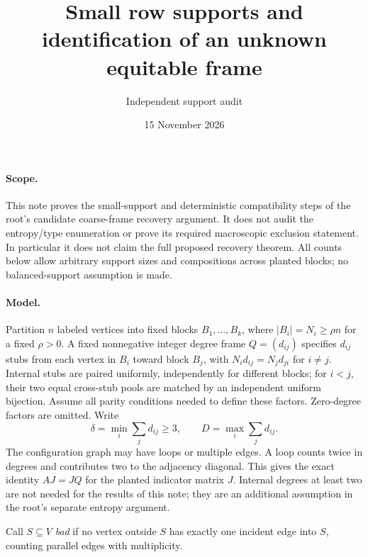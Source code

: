 \documentclass[11pt]{article}
\title{Small row supports and identification of an unknown equitable frame}
\author{Independent support audit}
\date{15 November 2026}
\begin{document}
\maketitle

\paragraph{Scope.}
This note proves the small-support and deterministic compatibility steps
of the root's candidate coarse-frame recovery argument. It does not audit
the entropy/type enumeration or prove its required macroscopic exclusion
statement. In particular it does not claim the full proposed recovery
theorem. All counts below allow arbitrary support sizes and compositions
across planted blocks; no balanced-support assumption is made.

\paragraph{Model.}
Partition $n$ labeled vertices into fixed blocks $B_1,\ldots,B_k$, where
$|B_i|=N_i\geq\rho n$ for a fixed $\rho>0$. A fixed nonnegative integer
degree frame $Q=(d_{ij})$ specifies $d_{ij}$ stubs from each vertex in
$B_i$ toward block $B_j$, with $N_i d_{ij}=N_j d_{ji}$ for $i\ne j$.
Internal stubs are paired uniformly, independently for different blocks;
for $i<j$, their two equal cross-stub pools are matched by an independent
uniform bijection. Assume all parity conditions needed to define these
factors. Zero-degree factors are omitted. Write
\[
 \delta=\min_i\sum_jd_{ij}\geq3,
 \qquad D=\max_i\sum_jd_{ij}.
\]
The configuration graph may have loops or multiple edges. A loop counts
twice in degrees and contributes two to the adjacency diagonal. This
gives the exact identity $AJ=JQ$ for the planted indicator matrix $J$.
Internal degrees at least two are not needed for the results of this note;
they are an additional assumption in the root's separate entropy argument.

Call $S\subseteq V$ \emph{bad} if no vertex outside $S$ has exactly one
incident edge into $S$, counting parallel edges with multiplicity.
\end{document}
